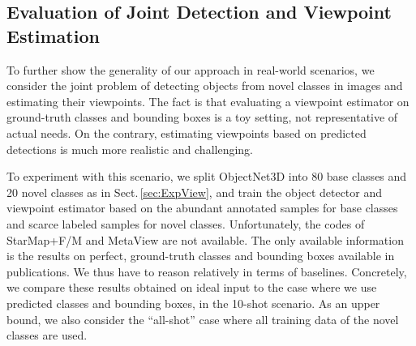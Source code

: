 \documentclass[runningheads]{llncs}
\begin{document}
\subsection{Evaluation of Joint Detection and Viewpoint Estimation}
\label{sec:ExpDetView}

To further show the generality of our approach in real-world scenarios, we consider the joint problem of detecting objects from novel classes in images and estimating their viewpoints.  The fact is that evaluating a viewpoint estimator on ground-truth classes and bounding boxes is a toy setting, not representative of actual needs.  On the contrary, estimating viewpoints based on predicted detections is much more realistic and challenging.


To experiment with this scenario, we split ObjectNet3D into 80 base classes and 20 novel classes as in Sect.\,\ref{sec:ExpView}, and train the object detector and viewpoint estimator based on the abundant annotated samples for base classes and scarce labeled samples for novel classes.
Unfortunately, the codes of StarMap+F/M and MetaView are not available.  The only available information is the results on perfect, ground-truth classes and bounding boxes available in publications.  We thus have to reason relatively in terms of baselines.  Concretely, we compare these results obtained on ideal input to the case where we use predicted classes and bounding boxes, in the 10-shot scenario. As an upper bound, we also consider the ``all-shot'' case where all training data of the novel classes are used.
\end{document}
